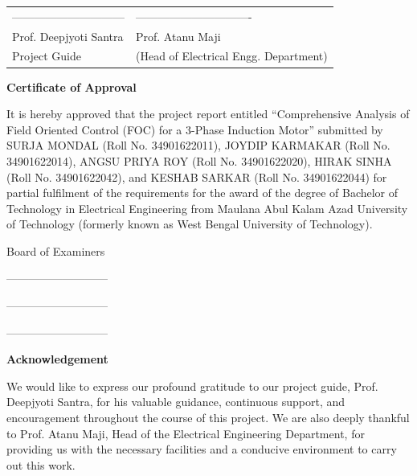 \documentclass[12pt,a4paper]{report}
\begin{document}
\noindent
\begin{tabular}{@{}p{8cm}p{8cm}@{}}
------------------------------ & ------------------------------- \\
Prof. Deepjyoti Santra & Prof. Atanu Maji \\
Project Guide & (Head of Electrical Engg. Department)
\end{tabular}

\newpage
\begin{center}
{\Large \bfseries Certificate of Approval\par}
\end{center}
\vspace{1cm}
It is hereby approved that the project report entitled ``Comprehensive Analysis of Field Oriented Control (FOC) for a 3-Phase Induction Motor'' submitted by SURJA MONDAL (Roll No. 34901622011), JOYDIP KARMAKAR (Roll No. 34901622014), ANGSU PRIYA ROY (Roll No. 34901622020), HIRAK SINHA (Roll No. 34901622042), and KESHAB SARKAR (Roll No. 34901622044) for partial fulfilment of the requirements for the award of the degree of Bachelor of Technology in Electrical Engineering from Maulana Abul Kalam Azad University of Technology (formerly known as West Bengal University of Technology).
\vspace{3cm}

\noindent Board of Examiners
\vspace{1.5cm}

\noindent --------------------------- \\
\vspace{1cm}

\noindent --------------------------- \\
\vspace{1cm}

\noindent ---------------------------

\newpage
\begin{center}
{\Large \bfseries Acknowledgement\par}
\end{center}
\vspace{1cm}
We would like to express our profound gratitude to our project guide, Prof. Deepjyoti Santra, for his valuable guidance, continuous support, and encouragement throughout the course of this project. We are also deeply thankful to Prof. Atanu Maji, Head of the Electrical Engineering Department, for providing us with the necessary facilities and a conducive environment to carry out this work.
\end{document}
